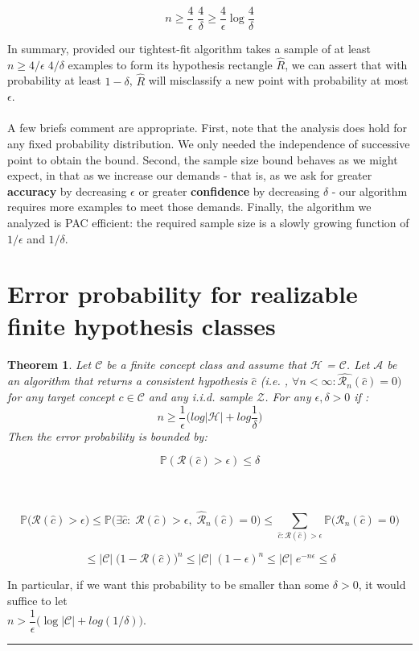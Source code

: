 \documentclass[twoside]{article}
\newcounter{lecnum}
\newtheorem{theorem}{Theorem}[lecnum]
\newenvironment{proof}{{\bf Proof:}}{\hfill\rule{2mm}{2mm}}
\begin{document}
$$n \geq \dfrac{4}{\epsilon} \; \dfrac{4}{\delta} \geq \dfrac{4}{\epsilon} \log{\dfrac{4}{\delta}}$$

In summary, provided our tightest-fit algorithm takes a sample of at least $n \geq 4/\epsilon \; 4/\delta$ examples to form its hypothesis rectangle $\hat{R}$, we can assert that with probability at least $1-\delta$, $\hat{R}$ will misclassify a new point with probability at most $\epsilon$.\\\\
A few briefs comment are appropriate. First, note that the analysis does hold for any fixed probability distribution. We only needed the independence of successive point to obtain the bound. Second, the sample size bound behaves as we might expect, in that as we increase our demands - that is, as we ask for greater \textbf{accuracy} by decreasing $\epsilon$ or greater \textbf{confidence} by decreasing $\delta$ - our algorithm requires more examples to meet those demands. Finally, the algorithm we analyzed is PAC efficient: the required sample size is a slowly growing function of $1/\epsilon$ and $1/\delta$.
\newpage
\section{Error probability for realizable finite hypothesis classes}

\begin{theorem}
Let $\mathcal{C}$ be a finite concept class and assume that $\mathcal{H}$ = $\mathcal{C}$. Let $\mathcal{A}$ be an algorithm that returns a consistent hypothesis $\hat{c}$ (i.e. , $\forall n < \infty : \hat{\mathcal{R}_{n}}(\hat{c})=0)$ for any target concept $c \in \mathcal{C}$ and any i.i.d. sample $\mathcal{Z}$. For any $\epsilon, \delta >0$ if :
$$ n \geq \dfrac{1}{\epsilon}\Big(log{|\mathcal{H}|} + log{\dfrac{1}{\delta}}\Big)$$
Then the error probability is bounded by:

$$\mathbb{P}(\mathcal{R}(\hat{c})> \epsilon) \leq \delta $$
\end{theorem}

\begin{proof}\\ \\
$$\mathbb{P}\Big(\mathcal{R}(\hat{c})> \epsilon\Big) \leq \mathbb{P}\Big( \exists \hat{c}: \; \mathcal{R}(\hat{c}) > \epsilon,\; \hat{\mathcal{R}}_{n}(\hat{c}) = 0\Big) \leq \sum_{\hat{c}:\mathcal{R}(\hat{c}) > \epsilon}\mathbb{P}\Big(\mathcal{R}_{n}(\hat{c}) =0 \Big)$$

$$\leq |\mathcal{C}| \; \Big  (1-\mathcal{R}(\hat{c})\Big)^n \leq |\mathcal{C}| \; (1-\epsilon)^n \leq |\mathcal{C}| \; e^{-n \epsilon} \leq \delta$$

In particular, if we want
this probability to be smaller than some $\delta > 0$, it would suffice to let\\ $n > \dfrac{1}{\epsilon} \big(\log{|\mathcal{C}|}+  log(1/\delta) \big)$.
\end{proof}
\end{document}
